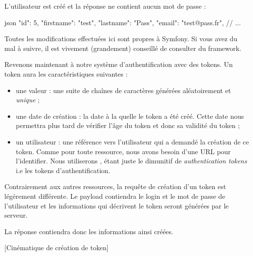 \documentclass[big]{zmdocument}
\begin{document}
L'utilisateur est créé et la réponse ne contient aucun mot de passe :



\begin{CodeBlock}{json}
{
  "id": 5,
  "firstname": "test",
  "lastname": "Pass",
  "email": "test@pass.fr",
  // ...
}
\end{CodeBlock}



\begin{Warning}
Toutes les modifications effectuées ici sont propres à Symfony. Si vous avez du mal à suivre, il est vivement (grandement) conseillé de consulter  du framework.
\end{Warning}




Revenons maintenant à notre système d'authentification avec des tokens.
Un token aura les caractéristiques suivantes :



\begin{itemize}
\item une valeur : une suite de chaînes de caractères générées aléatoirement et \textit{unique} ;
\item une date de création : la date à la quelle le token a été créé. Cette date nous permettra plus tard de vérifier l'âge du token et donc sa validité du token ;
\item un utilisateur : une référence vers l'utilisateur qui a demandé la création de ce token. 
Comme pour toute ressource, nous avons besoin d'une URL pour l'identifier. Nous utiliserons ,  étant juste le dimunitif de \textit{authentication tokens} i.e les tokens d'authentification.
\end{itemize}


Contrairement aux autres ressources, la requête de création d'un token est légérement différente. Le payload contiendra le login et le mot de passe de l'utilisateur et les informations qui décrivent le token seront générées par le serveur.



La réponse contiendra donc les informations ainsi créées.



[Cinématique de création de token]
\end{document}
